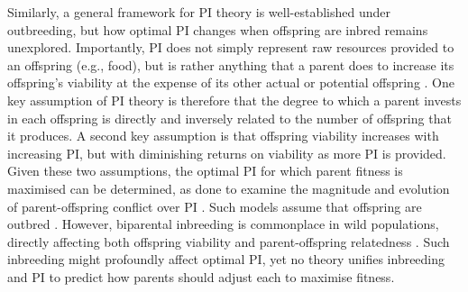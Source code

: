 \documentclass[12pt]{article}
\begin{document}
Similarly, a general framework for PI theory is well-established under outbreeding, but how optimal PI changes when offspring are inbred remains unexplored. Importantly, PI does not simply represent raw resources provided to an offspring (e.g., food), but is rather anything that a parent does to increase its offspring's viability at the expense of its other actual or potential offspring \cite[][]{Trivers1972, Trivers1974}. One key assumption of PI theory is therefore that the degree to which a parent invests in each offspring is directly and inversely related to the number of offspring that it produces. A second key assumption is that offspring viability increases with increasing PI, but with diminishing returns on viability as more PI is provided. Given these two assumptions, the optimal PI for which parent fitness is maximised can be determined, as done to examine the magnitude and evolution of parent-offspring conflict over PI \cite[e.g.,][]{Macnair1978, Parker1978, Parker1985, DeJong2005, Kuijper2012}. Such models assume that offspring are outbred \cite[or result from self-fertilisation,][]{DeJong2005}. However, biparental inbreeding is commonplace in wild populations, directly affecting both offspring viability and parent-offspring relatedness \cite[][]{OGrady2006, Charlesworth2009}. Such inbreeding might profoundly affect optimal PI, yet no theory unifies inbreeding and PI to predict how parents should adjust each to maximise fitness. %
\end{document}
